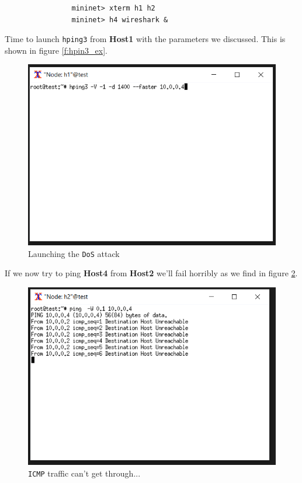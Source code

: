 \documentclass[12pt]{report}
\begin{document}
			\begin{verbatim}
				mininet> xterm h1 h2
				mininet> h4 wireshark &
			\end{verbatim}

			Time to launch \texttt{hping3} from \textbf{Host1} with the parameters we discussed. This is shown in figure \ref{f:hpin3_ex}.

			\begin{figure}
				\centering
				\includegraphics[scale = 1]{launch_hping3.png}
				\caption{Launching the \texttt{DoS} attack}
				\label{f:hping3_ex}
			\end{figure}

			If we now try to ping \textbf{Host4} from \textbf{Host2} we'll fail horribly as we find in figure \ref{f:net_down}.

			\begin{figure}
				\centering
				\includegraphics[scale = 1]{net_down.png}
				\caption{\texttt{ICMP} traffic can't get through...}
				\label{f:net_down}
			\end{figure}
\end{document}

